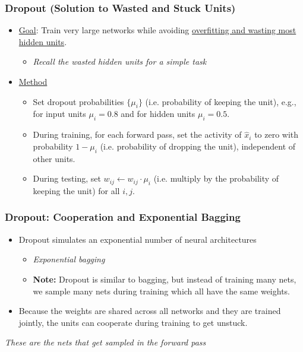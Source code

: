 \subsubsection{Dropout (Solution to Wasted and Stuck Units)}
\begin{summary}
    \begin{itemize}
        \item \underline{Goal}: Train very large networks while avoiding \underline{overfitting and wasting most hidden units}.
        
        \begin{itemize}
            \item \textit{Recall the wasted hidden units for a simple task}
        \end{itemize}
    
        \item \underline{Method}
        \begin{itemize}
            \item Set dropout probabilities \(\{\mu_i\}\) (i.e. probability of keeping the unit), e.g., for input units \(\mu_i = 0.8\) and for hidden units \(\mu_i = 0.5\).
            \item During training, for each forward pass, set the activity of \(\hat{x}_i\) to zero with probability \(1 - \mu_i\) (i.e. probability of dropping the unit), independent of other units.
            \item During testing, set \( w_{ij} \leftarrow w_{ij} \cdot \mu_i \) (i.e. multiply by the probability of keeping the unit) for all $i,j$.
        \end{itemize}
    \end{itemize}
\end{summary}


\subsubsection{Dropout: Cooperation and Exponential Bagging}
\begin{summary}
    \begin{itemize}
        \item Dropout simulates an exponential number of neural architectures 
        \begin{itemize}
            \item \textit{Exponential bagging}
            \item \textbf{Note:} Dropout is similar to bagging, but instead of training many nets, we sample many nets during training which all have the same weights.
        \end{itemize}
        
        \item Because the weights are shared across all networks and they are trained jointly, the units can cooperate during training to get unstuck.
    \end{itemize}
    
    
    \textit{These are the nets that get sampled in the forward pass}
\end{summary}



